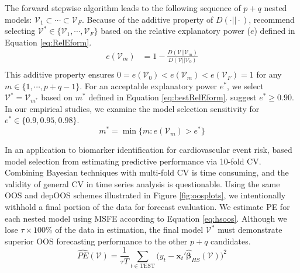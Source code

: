 The forward stepwise algorithm leads to the following sequence of $p+q$ nested models: $\mathcal{V}_1 \subset \cdots \subset \mathcal{V}_F$. Because of the additive property of $D(\cdot||\cdot)$, \cite{Dupuis2003} recommend selecting $\mathcal{V}^* \in \{\mathcal{V}_1,\cdots,\mathcal{V}_F\}$ based on the relative explanatory power ($e$) defined in Equation \ref{eq:RelEform}. 
\begin{equation}
\label{eq:RelEform}
\begin{split}
e(\mathcal{V}_{m})&=1-\frac{D(\mathcal{V}||\mathcal{V}_m)}{D(\mathcal{V}||\mathcal{V}_0)}\\
\end{split}
\end{equation}
This additive property ensures $0=e(\mathcal{V}_{0}) < e(\mathcal{V}_{m})< e(\mathcal{V}_{F})=1$ for any $m\in\{1,\cdots,p+q-1\}$. For an acceptable explanatory power $e^*$, we select $\mathcal{V}^*=\mathcal{V}_{m^*}$ based on $m^*$ defined in Equation \ref{eq:bestRelEform}. \cite{Piironen2015} suggest $e^*\geq 0.90$.  In our empirical studies, we examine the model selection sensitivity for $e^*\in\{0.9,0.95,0.98\}$.
\begin{equation}
\label{eq:bestRelEform}
m^*=\min \{m: e(\mathcal{V}_{m})>e^*\}
\end{equation}

In an application to biomarker identification for cardiovascular event risk, \cite{Peltola2014} based model selection from estimating predictive performance via 10-fold CV. Combining Bayesian techniques with multi-fold CV is time consuming, and the validity of general CV in time series analysis is questionable. Using the same OOS and depOOS schemes illustrated in Figure \ref{fig:oosplots}, we intentionally withhold a final portion of the data for forecast evaluation. We estimate PE for each nested model using MSFE according to Equation \ref{eq:hsoos}. Although we lose  $\tau\times 100\%$ of the data in estimation, the final model $\mathcal{V}^*$ must demonstrate superior OOS forecasting performance to the other $p+q$ candidates.
\begin{equation}
\label{eq:hsoos}
	\widehat{PE}(\mathcal{V})=\frac{1}{\tau T}\sum\limits_{t\in \textrm{TEST}} \bigg(y_t-\bm{x}_t'\hat{\bm{\beta}}_{HS}(\mathcal{V})\bigg)^2
\end{equation}












